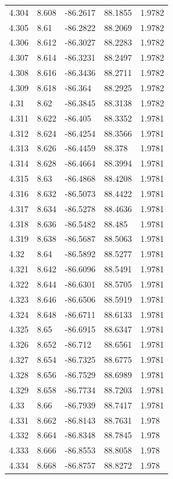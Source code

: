 \begin{tabular}{lllll}
4.304 & 8.608 & -86.2617 & 88.1855 & 1.9782 \\
4.305 & 8.61 & -86.2822 & 88.2069 & 1.9782 \\
4.306 & 8.612 & -86.3027 & 88.2283 & 1.9782 \\
4.307 & 8.614 & -86.3231 & 88.2497 & 1.9782 \\
4.308 & 8.616 & -86.3436 & 88.2711 & 1.9782 \\
4.309 & 8.618 & -86.364 & 88.2925 & 1.9782 \\
4.31 & 8.62 & -86.3845 & 88.3138 & 1.9782 \\
4.311 & 8.622 & -86.405 & 88.3352 & 1.9781 \\
4.312 & 8.624 & -86.4254 & 88.3566 & 1.9781 \\
4.313 & 8.626 & -86.4459 & 88.378 & 1.9781 \\
4.314 & 8.628 & -86.4664 & 88.3994 & 1.9781 \\
4.315 & 8.63 & -86.4868 & 88.4208 & 1.9781 \\
4.316 & 8.632 & -86.5073 & 88.4422 & 1.9781 \\
4.317 & 8.634 & -86.5278 & 88.4636 & 1.9781 \\
4.318 & 8.636 & -86.5482 & 88.485 & 1.9781 \\
4.319 & 8.638 & -86.5687 & 88.5063 & 1.9781 \\
4.32 & 8.64 & -86.5892 & 88.5277 & 1.9781 \\
4.321 & 8.642 & -86.6096 & 88.5491 & 1.9781 \\
4.322 & 8.644 & -86.6301 & 88.5705 & 1.9781 \\
4.323 & 8.646 & -86.6506 & 88.5919 & 1.9781 \\
4.324 & 8.648 & -86.6711 & 88.6133 & 1.9781 \\
4.325 & 8.65 & -86.6915 & 88.6347 & 1.9781 \\
4.326 & 8.652 & -86.712 & 88.6561 & 1.9781 \\
4.327 & 8.654 & -86.7325 & 88.6775 & 1.9781 \\
4.328 & 8.656 & -86.7529 & 88.6989 & 1.9781 \\
4.329 & 8.658 & -86.7734 & 88.7203 & 1.9781 \\
4.33 & 8.66 & -86.7939 & 88.7417 & 1.9781 \\
4.331 & 8.662 & -86.8143 & 88.7631 & 1.978 \\
4.332 & 8.664 & -86.8348 & 88.7845 & 1.978 \\
4.333 & 8.666 & -86.8553 & 88.8058 & 1.978 \\
4.334 & 8.668 & -86.8757 & 88.8272 & 1.978 \\

\end{tabular}

